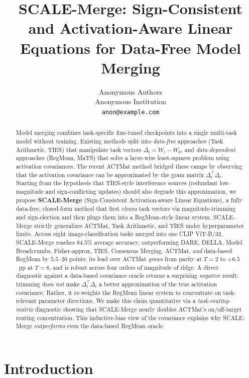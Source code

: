 \documentclass{article} %
\title{SCALE-Merge: Sign-Consistent and Activation-Aware Linear Equations for Data-Free Model Merging}
\author{Anonymous Authors\\
Anonymous Institution\\
\texttt{anon@example.com}
}
\begin{document}
\maketitle

\begin{abstract}
Model merging combines task-specific fine-tuned checkpoints into a single multi-task model without training. Existing methods split into \emph{data-free} approaches (Task Arithmetic, TIES) that manipulate task vectors $\Delta_t=W_t-W_0$, and \emph{data-dependent} approaches (RegMean, MaTS) that solve a layer-wise least-squares problem using activation covariances. The recent ACTMat method bridged these camps by observing that the activation covariance can be approximated by the gram matrix $\Delta_t^\top\Delta_t$. Starting from the hypothesis that TIES-style interference sources (redundant low-magnitude and sign-conflicting updates) should also degrade this approximation, we propose \textbf{SCALE-Merge} (Sign-Consistent Activation-aware Linear Equations), a fully data-free, closed-form method that first \emph{cleans} task vectors via magnitude-trimming and sign-election and then plugs them into a RegMean-style linear system. SCALE-Merge strictly generalizes ACTMat, Task Arithmetic, and TIES under hyperparameter limits. Across eight image-classification tasks merged into one CLIP ViT-B/32, SCALE-Merge reaches $84.5\%$ average accuracy, outperforming DARE, DELLA, Model Breadcrumbs, Fisher-approx, TIES, Consensus Merging, ACTMat, \emph{and} data-based RegMean by $5.5$--$20$ points; its lead over ACTMat \emph{grows} from parity at $T{=}2$ to $+6.5$~pp at $T{=}8$, and is robust across four orders of magnitude of ridge.
A direct diagnostic against a data-based covariance oracle returns a surprising \emph{negative} result: trimming does \emph{not} make $\Delta_t^\top\Delta_t$ a better approximation of the true activation covariance. Rather, it re-weights the RegMean linear system to concentrate on task-relevant parameter directions. We make this claim quantitative via a \emph{task-routing-matrix} diagnostic showing that SCALE-Merge nearly doubles ACTMat's on/off-target routing concentration. This inductive-bias view of the covariance explains why SCALE-Merge \emph{outperforms} even the data-based RegMean oracle.
\end{abstract}

\section{Introduction}
\end{document}
